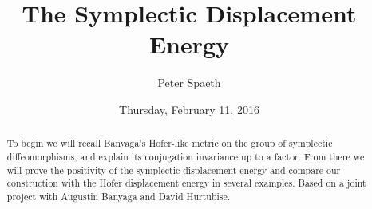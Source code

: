 \documentclass{UAmathtalk}
\author{Peter Spaeth}
\title{The Symplectic Displacement Energy}
\date{Thursday, February 11, 2016}
\begin{document}
\maketitle

\begin{abstract}
To begin we will recall Banyaga's Hofer-like metric on the group of symplectic diffeomorphisms, and explain its conjugation invariance up to a factor. From there we will prove the positivity of the symplectic displacement energy and compare our construction with the Hofer displacement energy in several examples. Based on a joint project with Augustin Banyaga and David Hurtubise.
\end{abstract}
\end{document}
